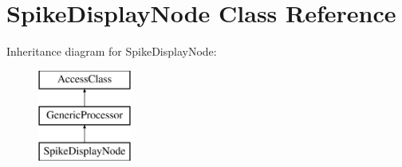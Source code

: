\hypertarget{classSpikeDisplayNode}{\section{Spike\-Display\-Node Class Reference}
\label{classSpikeDisplayNode}
}
Inheritance diagram for Spike\-Display\-Node\-:\begin{figure}[H]
\begin{center}
\leavevmode
\includegraphics[height=3.000000cm]{classSpikeDisplayNode}
\end{center}
\end{figure}
